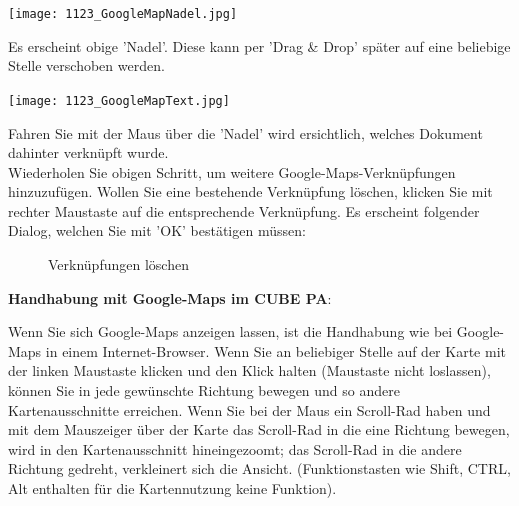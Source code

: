 \vspace{4mm}

\hspace{15mm} \texttt{[image: 1123\_GoogleMapNadel.jpg]}

Es erscheint obige 'Nadel'. Diese kann per 'Drag \& Drop' später auf eine beliebige Stelle verschoben werden.

\hspace{15mm} \texttt{[image: 1123\_GoogleMapText.jpg]}

Fahren Sie mit der Maus über die 'Nadel' wird ersichtlich, welches Dokument dahinter verknüpft wurde. \\

Wiederholen Sie obigen Schritt, um weitere Google-Maps-Verknüpfungen hinzuzufügen. Wollen Sie eine bestehende Verknüpfung löschen, klicken Sie mit rechter Maustaste auf die entsprechende Verknüpfung. Es erscheint folgender Dialog, welchen Sie mit 'OK' bestätigen müssen: 

\begin{figure}[H]
\caption{Verknüpfungen löschen}
\end{figure}

\vspace{\baselineskip}
\pagebreak

\textbf{Handhabung mit Google-Maps im CUBE PA}:

Wenn Sie sich Google-Maps anzeigen lassen, ist die Handhabung wie bei Google-Maps in einem Internet-Browser. Wenn Sie an beliebiger Stelle auf der Karte mit der linken Maustaste klicken und den Klick halten (Maustaste nicht loslassen), können Sie in jede gewünschte Richtung bewegen und so andere Kartenausschnitte erreichen. Wenn Sie bei der Maus ein Scroll-Rad haben und mit dem Mauszeiger über der Karte das Scroll-Rad in die eine Richtung bewegen, wird in den Kartenausschnitt hineingezoomt; das Scroll-Rad in die andere Richtung gedreht, verkleinert sich die Ansicht. (Funktionstasten wie Shift, CTRL, Alt enthalten für die Kartennutzung keine Funktion).

\vspace{\baselineskip}

